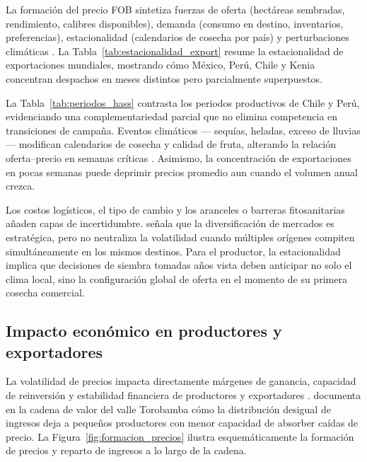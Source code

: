 La formaci\'on del precio FOB sintetiza fuerzas de oferta (hect\'areas sembradas, rendimiento, calibres disponibles), demanda (consumo en destino, inventarios, preferencias), estacionalidad (calendarios de cosecha por pa\'is) y perturbaciones clim\'aticas \citep{SierraSelva2020, Velasquez2025}. La Tabla~\ref{tab:estacionalidad_export} resume la estacionalidad de exportaciones mundiales, mostrando c\'omo M\'exico, Per\'u, Chile y Kenia concentran despachos en meses distintos pero parcialmente superpuestos.





La Tabla~\ref{tab:periodos_hass} contrasta los periodos productivos de Chile y Per\'u, evidenciando una complementariedad parcial que no elimina competencia en transiciones de campa\~na. Eventos clim\'aticos --- sequ\'ias, heladas, exceso de lluvias --- modifican calendarios de cosecha y calidad de fruta, alterando la relaci\'on oferta--precio en semanas cr\'iticas \citep{Capunay2025}. Asimismo, la concentraci\'on de exportaciones en pocas semanas puede deprimir precios promedio aun cuando el volumen anual crezca.

Los costos log\'isticos, el tipo de cambio y los aranceles o barreras fitosanitarias a\~naden capas de incertidumbre. \citet{ComexPeru2025} se\~nala que la diversificaci\'on de mercados es estrat\'egica, pero no neutraliza la volatilidad cuando m\'ultiples or\'igenes compiten simult\'aneamente en los mismos destinos. Para el productor, la estacionalidad implica que decisiones de siembra tomadas a\~nos vista deben anticipar no solo el clima local, sino la configuraci\'on global de oferta en el momento de su primera cosecha comercial.

\subsection{Impacto econ\'omico en productores y exportadores}

La volatilidad de precios impacta directamente m\'argenes de ganancia, capacidad de reinversi\'on y estabilidad financiera de productores y exportadores \citep{Capunay2025, VargasCordova2025}. \citet{VargasCordova2025} documenta en la cadena de valor del valle Torobamba c\'omo la distribuci\'on desigual de ingresos deja a pequeños productores con menor capacidad de absorber ca\'idas de precio. La Figura~\ref{fig:formacion_precios} ilustra esquem\'aticamente la formaci\'on de precios y reparto de ingresos a lo largo de la cadena.

